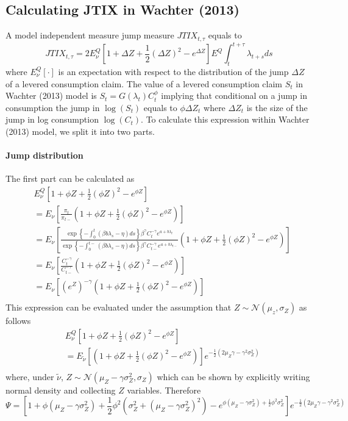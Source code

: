 \documentclass[11pt]{article}
\begin{document}
\subsection{Calculating JTIX in Wachter (2013)}

A model independent measure jump measure $JTIX_{t,\tau}$ equals to
\[JTIX_{t,\tau} = 2 E^Q_\nu\left[1 + \Delta Z + \frac12 (\Delta Z)^2 - e^{\Delta Z}\right]E^Q\int_t^{t+\tau} \lambda_{t+s}ds\]
where $E^Q_\nu[\cdot]$ is an expectation with respect to the distribution of the jump $\Delta Z$ of a levered consumption claim. The value of a levered consumption claim $S_t$ in Wachter (2013) model is $S_t = G(\lambda_t)C_t^\phi$ implying that conditional on a jump in consumption the jump in $\log(S_t)$ equals to $\phi \Delta Z_t$ where $\Delta Z_t$ is the size of the jump in log consumption $\log(C_t)$.
To calculate this expression within Wachter (2013) model, we split it into two parts. 

\paragraph{Jump distribution} The first part can be calculated as
\[
    \begin{aligned}
        &E^Q_\nu\left[1 + \phi Z + \frac12 (\phi Z)^2 - e^{\phi Z}\right] \\
        &= E_\nu\left[\frac{\pi_t}{\pi_{t-}}\left(1 + \phi Z + \frac12 (\phi Z)^2 - e^{\phi Z}\right)\right] \\
        &= E_\nu\left[\frac{\exp\left\{-\int_0^t (\beta b \lambda_s - \eta)ds\right\}\beta^\gamma C_{t}^{-\gamma}e^{a + b\lambda_t}}{\exp\left\{-\int_0^{t-} (\beta b \lambda_s - \eta)ds\right\}\beta^\gamma C_{t-}^{-\gamma}e^{a + b\lambda_{t-}}}\left(1 + \phi Z + \frac12 (\phi Z)^2 - e^{\phi Z}\right)\right] \\
        &= E_\nu\left[\frac{C_{t}^{-\gamma}}{C_{t-}^{-\gamma}}\left(1 + \phi Z + \frac12 (\phi Z)^2 - e^{\phi Z}\right)\right] \\
        &= E_\nu\left[\left(e^{Z}\right)^{-\gamma}\left(1 + \phi Z + \frac12 (\phi Z)^2 - e^{\phi Z}\right)\right] \\
    \end{aligned}
\]
This expression can be evaluated under the assumption that $Z \sim \mathcal{N}(\mu_z,\sigma_Z)$ as follows
\[
    \begin{aligned}
        &E^Q_\nu\left[1 + \phi Z + \frac12 (\phi Z)^2 - e^{\phi Z}\right] \\
        &= E_{\tilde{\nu}}\left[\left(1 + \phi Z + \frac12 (\phi Z)^2 - e^{\phi Z}\right)\right]e^{-\frac{1}{2}(2\mu_Z \gamma - \gamma^2\sigma_Z^2)} \\
    \end{aligned}
\]
where, under $\tilde{\nu}$, $Z\sim\mathcal{N}(\mu_Z - \gamma\sigma_Z^2,\sigma_Z)$ which can be shown by explicitly writing normal density and collecting $Z$ variables. Therefore
\[
    \Psi = \left[1 + \phi(\mu_Z - \gamma\sigma_Z^2) + \frac{1}{2}\phi^2(\sigma_Z^2 + (\mu_Z - \gamma\sigma_Z^2)^2) - e^{\phi(\mu_Z - \gamma\sigma_Z^2) + \frac{1}{2}\phi^2\sigma_Z^2}\right]e^{-\frac{1}{2}(2\mu_Z \gamma - \gamma^2\sigma_Z^2)}
\]
\end{document}
